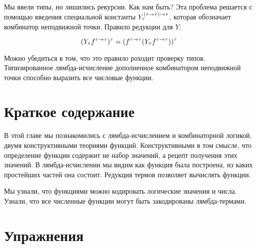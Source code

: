 Мы ввели типы, но лишились рекурсии. Как нам быть? 
Эта проблема решается с помощью введения специальной
константы $Y_\tau^{(\tau \rightarrow \tau) \rightarrow \tau}$, которая обозначает 
комбинатор неподвижной точки. Правило редукции для $Y$:

\[ (Y_\tau f^{\tau \rightarrow \tau})^\tau = 
    (f^{\tau \rightarrow \tau}(Y_\tau f^{\tau \rightarrow \tau}))^\tau \]

Можно убедиться в том, что это правило роходит проверку типов.
Типизированное лямбда-исчисление дополненное комбинатором
неподвижной точки способно выразить все числовые функции.

\section{Краткое содержание}

В этой главе мы познакомились с лямбда-исчислением
и комбинаторной логикой, двумя конструктивными теориями функций.
Конструктивными в том смысле, что определение функции содержит
не набор значений, а рецепт получения этих значений. В лямбда-исчислении
мы видим как функция была построена, из каких простейших частей она 
состоит. Редукция термов позволяет вычислять функции.

Мы узнали, что функциями можно кодировать логические значения и
числа. Узнали, что все численные функции могут быть закодированы
лямбда-термами. 

\section{Упражнения}

